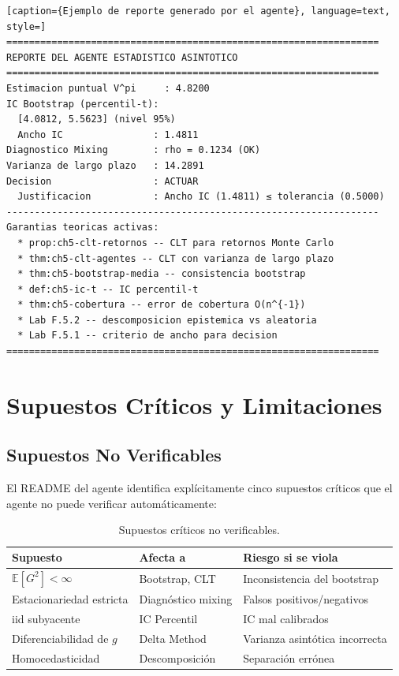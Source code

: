 \documentclass[12pt,a4paper]{article}
\begin{document}
\begin{lstlisting}[caption={Ejemplo de reporte generado por el agente}, language=text, style=]
==================================================================
REPORTE DEL AGENTE ESTADISTICO ASINTOTICO
==================================================================
Estimacion puntual V^pi     : 4.8200
IC Bootstrap (percentil-t):
  [4.0812, 5.5623] (nivel 95%)
  Ancho IC                : 1.4811
Diagnostico Mixing        : rho = 0.1234 (OK)
Varianza de largo plazo   : 14.2891
Decision                  : ACTUAR
  Justificacion           : Ancho IC (1.4811) ≤ tolerancia (0.5000)
------------------------------------------------------------------
Garantias teoricas activas:
  * prop:ch5-clt-retornos -- CLT para retornos Monte Carlo
  * thm:ch5-clt-agentes -- CLT con varianza de largo plazo
  * thm:ch5-bootstrap-media -- consistencia bootstrap
  * def:ch5-ic-t -- IC percentil-t
  * thm:ch5-cobertura -- error de cobertura O(n^{-1})
  * Lab F.5.2 -- descomposicion epistemica vs aleatoria
  * Lab F.5.1 -- criterio de ancho para decision
==================================================================
\end{lstlisting}

\newpage

\section{Supuestos Críticos y Limitaciones}

\subsection{Supuestos No Verificables}

El README del agente identifica explícitamente cinco supuestos críticos que el agente no puede verificar automáticamente:

\begin{table}[h]
	\centering
	\caption{Supuestos críticos no verificables.}
	\label{tab:supuestos}
	\begin{tabular}{@{}lll@{}}
		\toprule
		Supuesto                   & Afecta a           & Riesgo si se viola             \\
		\midrule
		$\mathbb{E}[G^2] < \infty$ & Bootstrap, CLT     & Inconsistencia del bootstrap   \\
		Estacionariedad estricta   & Diagnóstico mixing & Falsos positivos/negativos     \\
		iid subyacente             & IC Percentil       & IC mal calibrados              \\
		Diferenciabilidad de $g$   & Delta Method       & Varianza asintótica incorrecta \\
		Homocedasticidad           & Descomposición     & Separación errónea             \\
		\bottomrule
	\end{tabular}
\end{table}
\end{document}
